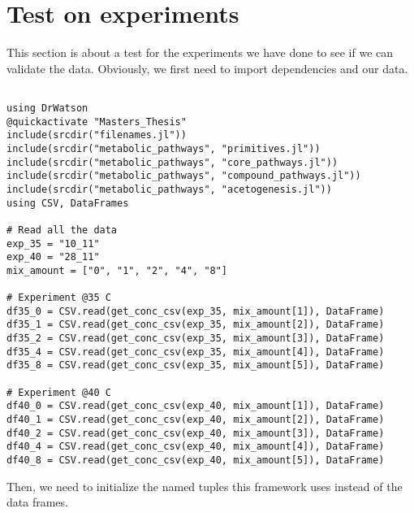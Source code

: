 \documentclass[11pt]{article}
\begin{document}
\section{Test on experiments}
\label{sec:org200ec7a}
This section is about a test for the experiments we have done to see if we can validate the data. Obviously, we first need to import dependencies and our data.

\begin{verbatim}

using DrWatson
@quickactivate "Masters_Thesis"
include(srcdir("filenames.jl"))
include(srcdir("metabolic_pathways", "primitives.jl"))
include(srcdir("metabolic_pathways", "core_pathways.jl"))
include(srcdir("metabolic_pathways", "compound_pathways.jl"))
include(srcdir("metabolic_pathways", "acetogenesis.jl"))
using CSV, DataFrames

# Read all the data
exp_35 = "10_11"
exp_40 = "28_11"
mix_amount = ["0", "1", "2", "4", "8"]

# Experiment @35 C
df35_0 = CSV.read(get_conc_csv(exp_35, mix_amount[1]), DataFrame)
df35_1 = CSV.read(get_conc_csv(exp_35, mix_amount[2]), DataFrame)
df35_2 = CSV.read(get_conc_csv(exp_35, mix_amount[3]), DataFrame)
df35_4 = CSV.read(get_conc_csv(exp_35, mix_amount[4]), DataFrame)
df35_8 = CSV.read(get_conc_csv(exp_35, mix_amount[5]), DataFrame)

# Experiment @40 C
df40_0 = CSV.read(get_conc_csv(exp_40, mix_amount[1]), DataFrame)
df40_1 = CSV.read(get_conc_csv(exp_40, mix_amount[2]), DataFrame)
df40_2 = CSV.read(get_conc_csv(exp_40, mix_amount[3]), DataFrame)
df40_4 = CSV.read(get_conc_csv(exp_40, mix_amount[4]), DataFrame)
df40_8 = CSV.read(get_conc_csv(exp_40, mix_amount[5]), DataFrame)

\end{verbatim}

Then, we need to initialize the named tuples this framework uses instead of the data frames.
\end{document}
